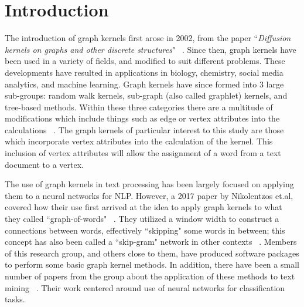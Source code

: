 %
%
%


\section{Introduction}

The introduction of graph kernels first arose in 2002, from the paper ``\textit{Diffusion kernels on graphs and other discrete structures}" ~\cite{kondor2002diffusion}. Since then, graph kernels have been used in a variety of fields, and modified to suit different problems. These developments have resulted in applications in biology, chemistry, social media analytics, and machine learning. Graph kernels have since formed into 3 large sub-groups: random walk kernels, sub-graph (also called graphlet) kernels, and tree-based methods. Within these three categories there are a multitude of modifications which include things such as edge or vertex attributes into the calculations ~\cite{vishwanathan2010graph}. The graph kernels of particular interest to this study are those which incorporate vertex attributes into the calculation of the kernel.  This inclusion of vertex attributes will allow the assignment of a word from a text document to a vertex. 

The use of graph kernels in text processing has been largely focused on applying them to a neural networks for NLP. However, a 2017 paper by Nikolentzos et.al, covered how their use first arrived at the idea to apply graph kernels to what they called ``graph-of-words" ~\cite{nikolentzos2017shortest}. They utilized a window width to construct a connections between words, effectively ``skipping" some words in between; this concept has also been called a ``skip-gram" network in other contexts ~\cite{cheng2006n}. Members of this research group, and others close to them, have produced software packages to perform some basic graph kernel methods. In addition, there have been a small number of papers from the group about the application of these methods to text mining ~\cite{sugiyama2018graphkernels}. Their work centered around use of neural networks for classification tasks. 



